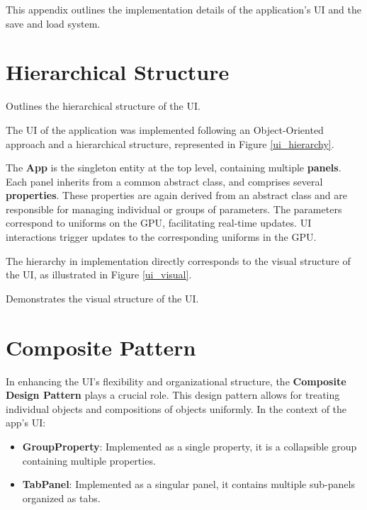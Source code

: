 \label{UI}

This appendix outlines the implementation details of the application's UI and the save and load system.

\section{Hierarchical Structure}

{Outlines the hierarchical structure of the UI.}{}

The UI of the application was implemented following an Object-Oriented approach and a hierarchical structure, represented in Figure \ref{ui_hierarchy}.

The \textbf{App} is the singleton entity at the top level, containing multiple \textbf{panels}. Each panel inherits from a common abstract class, and comprises several \textbf{properties}. These properties are again derived from an abstract class and are responsible for managing individual or groups of parameters. The parameters correspond to uniforms on the GPU, facilitating real-time updates. UI interactions trigger updates to the corresponding uniforms in the GPU.

The hierarchy in implementation directly corresponds to the visual structure of the UI, as illustrated in Figure \ref{ui_visual}.

{Demonstrates the visual structure of the UI.}

\section{Composite Pattern}

In enhancing the UI's flexibility and organizational structure, the \textbf{Composite Design Pattern} plays a crucial role. This design pattern allows for treating individual objects and compositions of objects uniformly. In the context of the app's UI:

\begin{itemize}
    \item \textbf{GroupProperty}: Implemented as a single property, it is a collapsible group containing multiple properties.
    \item \textbf{TabPanel}: Implemented as a singular panel, it contains multiple sub-panels organized as tabs. 
\end{itemize}

